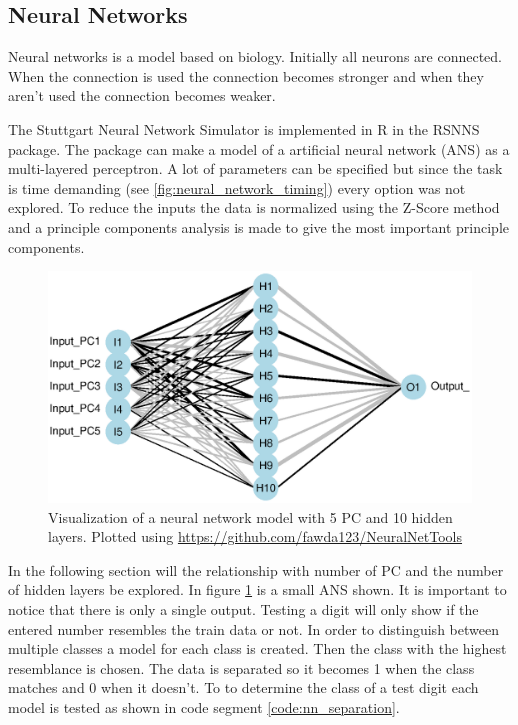 \subsection{Neural Networks}

Neural networks is a model based on biology. 
Initially all neurons are connected. 
When the connection is used the connection becomes stronger and when they aren't used the connection becomes weaker.

The Stuttgart Neural Network Simulator is implemented in R in the RSNNS package.
The package can make a model of a artificial neural network (ANS) as a multi-layered perceptron.
A lot of parameters can be specified but since the task is time demanding (see \ref{fig:neural_network_timing}) every option was not explored.
To reduce the inputs the data is normalized using the Z-Score method and a principle components analysis is made to give the most important principle components.

\begin{figure}[h]
    \includegraphics[width=\textwidth]{graphics/neural_network_visualized}
    \caption[Visualization of a neural network model.]{Visualization of a neural network model with 5 PC and 10 hidden layers. Plotted using \url{https://github.com/fawda123/NeuralNetTools}}
    \label{fig:neural_network_visualised}
\end{figure}

In the following section will the relationship with number of PC and the number of hidden layers be explored.
In figure \ref{fig:neural_network_visualised} is a small ANS shown.
It is important to notice that there is only a single output. 
Testing a digit will only show if the entered number resembles the train data or not.
In order to distinguish between multiple classes a model for each class is created.
Then the class with the highest resemblance is chosen.
The data is separated so it becomes 1 when the class matches and 0 when it doesn't.
To to determine the class of a test digit each model is tested as shown in code segment \ref{code:nn_separation}.

